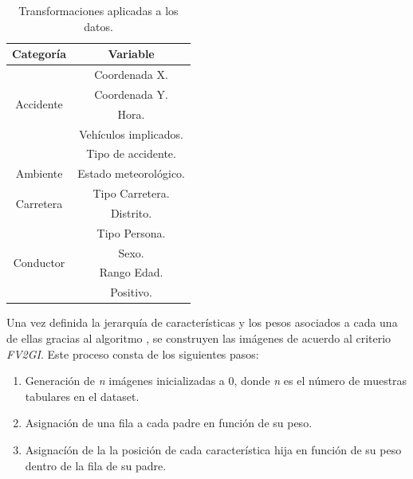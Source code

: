         \begin{table}[H]
          \centering
          \begin{tabular}{ |c|c| }
               \hline
               \textbf{Categoría} & \textbf{Variable}\\

               \hline
               \multirow{4}{*}{Accidente}            & Coordenada X.\\
                                                     & Coordenada Y.\\
                                                     & Hora.\\
                                                     & Vehículos implicados.\\
                                                     & Tipo de accidente.\\

               \hline
               \multirow{1}{*}{Ambiente}             & Estado meteorológico.\\

               \hline
               \multirow{2}{*}{Carretera}            & Tipo Carretera.\\
                                                     & Distrito.\\

               \hline
               \multirow{4}{*}{Conductor}            & Tipo Persona.\\
                                                     & Sexo.\\
                                                     & Rango Edad.\\
                                                     & Positivo.\\

               \hline
          \end{tabular}
          \caption{Transformaciones aplicadas a los datos.}
          \label{JerarquiaCaracteristicasTabla}
        \end{table}



        Una vez definida la jerarquía de características y los pesos asociados a cada una de ellas gracias al algoritmo , se construyen las imágenes de acuerdo al criterio \textit{FV2GI}. Este proceso consta de los siguientes pasos:

        \begin{enumerate}

            \item Generación de \textit{n} imágenes inicializadas a 0, donde \textit{n} es el número de muestras tabulares en el dataset.
            \item Asignación de una fila a cada padre en función de su peso.
            \item Asignacíón de la la posición de cada característica hija en función de su peso dentro de la fila de su padre.
        
        \end{enumerate}


